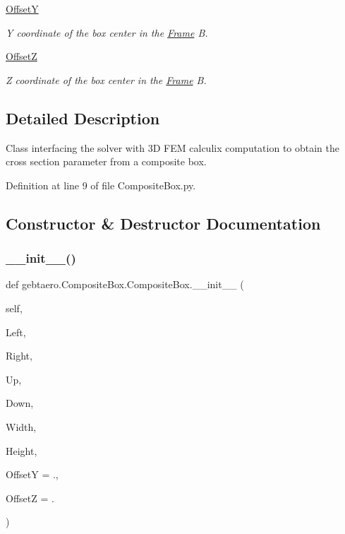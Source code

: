 \begin{DoxyCompactItemize}
\hyperlink{classgebtaero_1_1_composite_box_1_1_composite_box_a26fcf7763030afb28f45f2354125c352}{OffsetY}
\begin{DoxyCompactList}\small\item\em Y coordinate of the box center in the \hyperlink{namespacegebtaero_1_1_frame}{Frame} B. \end{DoxyCompactList}\item 
\hyperlink{classgebtaero_1_1_composite_box_1_1_composite_box_a50e38078e66133a95f34f2d9176329d9}{OffsetZ}
\begin{DoxyCompactList}\small\item\em Z coordinate of the box center in the \hyperlink{namespacegebtaero_1_1_frame}{Frame} B. \end{DoxyCompactList}\end{DoxyCompactItemize}


\subsection{Detailed Description}
Class interfacing the solver with 3D F\+EM calculix computation to obtain the cross section parameter from a composite box. 

Definition at line 9 of file Composite\+Box.\+py.



\subsection{Constructor \& Destructor Documentation}
\mbox{\label{classgebtaero_1_1_composite_box_1_1_composite_box_a64c4292dbd036313813fc00a78fb13cb}} 
\subsubsection{\texorpdfstring{\+\_\+\+\_\+init\+\_\+\+\_\+()}{\_\_init\_\_()}}
{\footnotesize\ttfamily def gebtaero.\+Composite\+Box.\+Composite\+Box.\+\_\+\+\_\+init\+\_\+\+\_\+ (\begin{DoxyParamCaption}\item[{}]{self,  }\item[{}]{Left,  }\item[{}]{Right,  }\item[{}]{Up,  }\item[{}]{Down,  }\item[{}]{Width,  }\item[{}]{Height,  }\item[{}]{OffsetY = {.},  }\item[{}]{OffsetZ = {.} }\end{DoxyParamCaption})}



